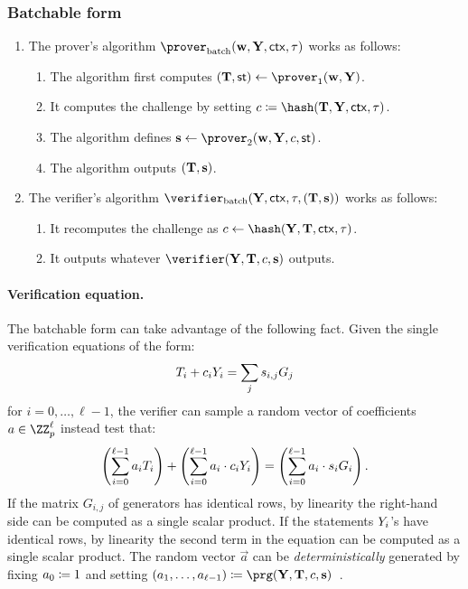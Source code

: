 \documentclass[runningheads]{llncs}
\begin{document}
\subsubsection{Batchable form}


\begin{enumerate}
  \item
    The prover's algorithm $\batchprover(\vec \witness, \vec \statement,\ctx, \stag)$ works as follows:
    \begin{enumerate}
      \item
        The algorithm first computes $(\vec \commitment,\st)\gets\prover_1(\vec \witness, \vec \statement)$.
      \item
        It computes the challenge by setting $c\defeq\hash(\vec \commitment, \vec \statement,\ctx, \stag)$.
      \item
        The algorithm defines $\vec \response\gets\prover_2(\vec \witness, \vec \statement,\challenge,\st)$.
      \item
        The algorithm outputs $(\mathbf {T}, \mathbf {s})$.
    \end{enumerate}
  \item
    The verifier's algorithm $\batchverifier(\vec \statement, \ctx, \stag, (\vec \commitment,\vec s))$ works as follows:
    \begin{enumerate}
      \item
        It recomputes the challenge as $c\gets\hash(\vec \statement, \vec \commitment, \ctx, \stag)$.
      \item
        It outputs whatever $\verifier(\vec \statement,\vec \commitment,\challenge,\vec \response)$ outputs.
    \end{enumerate}
\end{enumerate}


\paragraph{Verification equation.}
The batchable form can take advantage of the following fact.
Given the single verification equations of the form:
\[
   T_i + c_i Y_i = \sum_j s_{i, j} G_j
\]
for $i=0, \dots,\ell-1$,
the verifier can sample a random vector of coefficients $a \in \ZZ_p^\ell$ instead test that:
\[
  \left(\sum_{i=0}^{\ell-1} a_i T_i\right) + \left(\sum_{i=0}^{\ell-1} a_i \cdot  c_i Y_i \right) = \left(\sum_{i=0}^{\ell-1} a_i \cdot s_i G_i\right).
\]
If the matrix $G_{i, j}$ of generators has identical rows, by linearity the right-hand side can be computed as a single scalar product.
If the statements $Y_i$'s have identical rows, by linearity the second term in the equation can be computed as a single scalar product.
The random vector $\vec a$ can be \emph{deterministically} generated by fixing $a_0 \coloneqq 1$ and setting $(a_1, \dots, a_{\ell-1}) \defeq \prg(\vec Y, \vec T,  \challenge, \vec s)$~\cite{bip-schnorr}.
\end{document}
